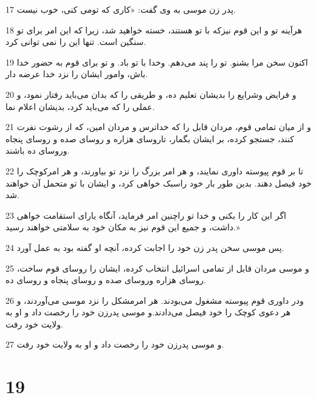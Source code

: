 \par 17 پدر زن موسی به وی گفت: «کاری که تومی کنی، خوب نیست.
\par 18 هرآینه تو و این قوم نیزکه با تو هستند، خسته خواهید شد، زیرا که این امر برای تو سنگین است. تنها این را نمی توانی کرد.
\par 19 اکنون سخن مرا بشنو. تو را پند می‌دهم. وخدا با تو باد. و تو برای قوم به حضور خدا باش، وامور ایشان را نزد خدا عرضه دار.
\par 20 و فرایض وشرایع را بدیشان تعلیم ده، و طریقی را که بدان می‌باید رفتار نمود، و عملی را که می‌باید کرد، بدیشان اعلام نما.
\par 21 و از میان تمامی قوم، مردان قابل را که خداترس و مردان امین، که از رشوت نفرت کنند، جستجو کرده، بر ایشان بگمار، تاروسای هزاره و روسای صده و روسای پنجاه وروسای ده باشند.
\par 22 تا بر قوم پیوسته داوری نمایند، و هر امر بزرگ را نزد تو بیاورند، و هر امرکوچک را خود فیصل دهند. بدین طور بار خود راسبک خواهی کرد، و ایشان با تو متحمل آن خواهند شد.
\par 23 اگر این کار را بکنی و خدا تو راچنین امر فرماید، آنگاه یارای استقامت خواهی داشت، و جمیع این قوم نیز به مکان خود به سلامتی خواهند رسید.»
\par 24 پس موسی سخن پدر زن خود را اجابت کرده، آنچه او گفته بود به عمل آورد.
\par 25 و موسی مردان قابل از تمامی اسرائیل انتخاب کرده، ایشان را روسای قوم ساخت، روسای هزاره وروسای صده و روسای پنجاه و روسای ده.
\par 26 ودر داوری قوم پیوسته مشغول می‌بودند. هر امرمشکل را نزد موسی می‌آوردند، و هر دعوی کوچک را خود فیصل می‌دادند.و موسی پدرزن خود را رخصت داد و او به ولایت خود رفت.
\par 27 و موسی پدرزن خود را رخصت داد و او به ولایت خود رفت.
 
\chapter{19}

